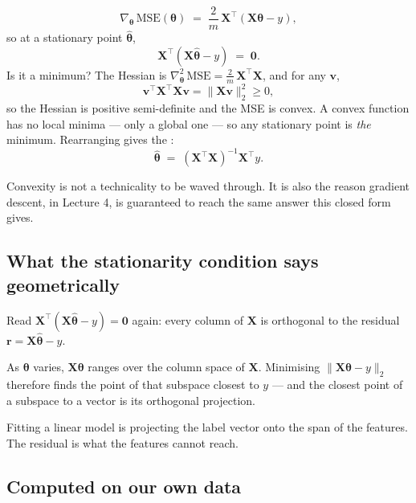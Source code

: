 \documentclass[11pt,a4paper]{article}
\begin{document}
\begin{derivbox}[title={Differentiate, and check the second order}]
\[ \nabla_{\boldsymbol\theta}\,\mathrm{MSE}(\boldsymbol\theta) \;=\;
   \frac{2}{m}\,\mathbf{X}^{\intercal}\!
   \left(\mathbf{X}\boldsymbol\theta - y\right), \]
so at a stationary point $\hat{\boldsymbol\theta}$,
\[ \mathbf{X}^{\intercal}\!\left(\mathbf{X}\hat{\boldsymbol\theta} - y\right)
   \;=\; \mathbf{0}. \]
Is it a minimum? The Hessian is
$\nabla^{2}_{\boldsymbol\theta}\,\mathrm{MSE} =
 \frac{2}{m}\,\mathbf{X}^{\intercal}\mathbf{X}$,
and for any $\mathbf{v}$,
\[ \mathbf{v}^{\intercal}\mathbf{X}^{\intercal}\mathbf{X}\mathbf{v}
   = \lVert \mathbf{X}\mathbf{v}\rVert_2^2 \ge 0, \]
so the Hessian is positive semi-definite and the MSE is convex. A convex
function has no local minima --- only a global one --- so any stationary point
is \emph{the} minimum. Rearranging gives the :
\[ \hat{\boldsymbol\theta} \;=\;
   \left(\mathbf{X}^{\intercal}\mathbf{X}\right)^{-1}\mathbf{X}^{\intercal}y. \]
\end{derivbox}

Convexity is not a technicality to be waved through. It is also the reason
gradient descent, in Lecture 4, is guaranteed to reach the same answer this
closed form gives.

\subsection{What the stationarity condition says geometrically}

Read $\mathbf{X}^{\intercal}(\mathbf{X}\hat{\boldsymbol\theta} - y) =
\mathbf{0}$ again: every column of $\mathbf{X}$ is orthogonal to the residual
$\mathbf{r} = \mathbf{X}\hat{\boldsymbol\theta} - y$.

As $\boldsymbol\theta$ varies, $\mathbf{X}\boldsymbol\theta$ ranges over the
column space of $\mathbf{X}$. Minimising
$\lVert \mathbf{X}\boldsymbol\theta - y\rVert_2$ therefore finds the point of
that subspace closest to $y$ --- and the closest point of a subspace to a
vector is its orthogonal projection.

\begin{keybox}[title={The sentence to remember}]
Fitting a linear model is projecting the label vector onto the span of the
features. The residual is what the features cannot reach.
\end{keybox}

\subsection{Computed on our own data}
\end{document}
